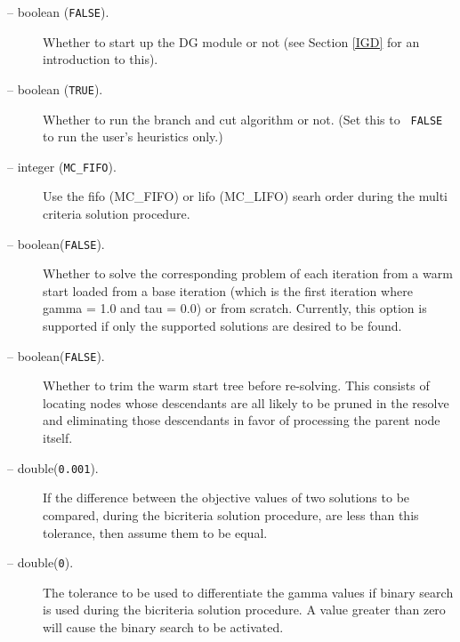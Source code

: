 \begin{description}
\item[ -- boolean ({\tt FALSE}).] 
Whether to start up the DG module or not (see Section \ref{IGD} for
an introduction to this).

\item[ -- boolean ({\tt TRUE}).] 
Whether to run the branch and cut algorithm or not. (Set this to {\tt
FALSE} to run the user's heuristics only.)

\item[ -- integer ({\tt MC\_FIFO}).] 
Use the fifo (MC\_FIFO) or lifo (MC\_LIFO) searh order during the multi
criteria solution procedure.

\item[ -- boolean({\tt FALSE}).] 
Whether to solve the corresponding problem of each iteration from a warm 
start loaded from a base iteration (which is the first iteration where 
gamma = 1.0 and tau = 0.0) or from scratch. Currently, this option is 
supported if only the supported solutions are desired to be found.

\item[ -- boolean({\tt FALSE}).] 
Whether to trim the warm start tree before re-solving. This consists of 
locating nodes whose descendants are all likely to be pruned in the resolve 
and eliminating those descendants in favor of processing the parent node 
itself.

\item[ -- double({\tt 0.001}).] 
If the difference between the objective values of two solutions to be compared,
during the bicriteria solution procedure, are less than this tolerance, then 
assume them to be equal. 

\item[ -- double({\tt 0}).] 
The tolerance to be used to differentiate the gamma values if binary search 
is used during the bicriteria solution procedure. A value greater than zero
will cause the binary search to be activated.

\end{description}

